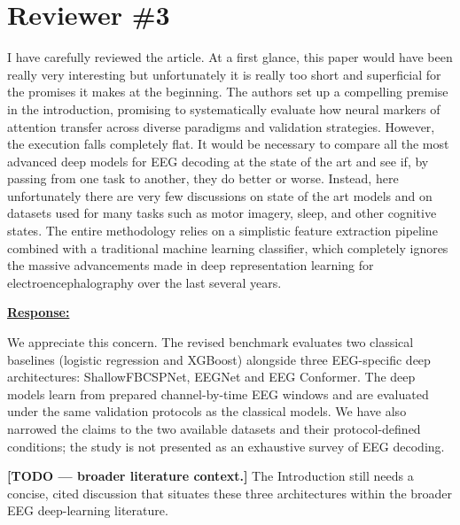 \documentclass{article}
\begin{document}
\vspace{0.3cm}


\newpage
\setcounter{tcb@cnt@cmt}{0}
\section*{Reviewer \#3}

\vspace{0.4cm}

\begin{cmt}{}{}

I have carefully reviewed the article. At a first glance, this paper would have
been really very interesting but unfortunately it is really too short and
superficial for the promises it makes at the beginning. The authors set up a
compelling premise in the introduction, promising to systematically evaluate how
neural markers of attention transfer across diverse paradigms and validation
strategies. However, the execution falls completely flat. It would be necessary
to compare all the most advanced deep models for EEG decoding at the state of
the art and see if, by passing from one task to another, they do better or
worse. Instead, here unfortunately there are very few discussions on state of
the art models and on datasets used for many tasks such as motor imagery, sleep,
and other cognitive states. The entire methodology relies on a simplistic
feature extraction pipeline combined with a traditional machine learning
classifier, which completely ignores the massive advancements made in deep
representation learning for electroencephalography over the last several years.

\end{cmt}
\vspace{0.1cm}
\noindent
\underline{\textbf{Response:}}
\vspace{0.2cm}

We appreciate this concern. The revised benchmark evaluates two classical
baselines (logistic regression and XGBoost) alongside three EEG-specific deep
architectures: ShallowFBCSPNet, EEGNet and EEG Conformer. The deep models learn
from prepared channel-by-time EEG windows and are evaluated under the same
validation protocols as the classical models. We have also narrowed the claims
to the two available datasets and their protocol-defined conditions; the study
is not presented as an exhaustive survey of EEG decoding.

\textbf{[TODO --- broader literature context.]}
The Introduction still needs a concise, cited discussion that situates these
three architectures within the broader EEG deep-learning literature.
\end{document}
